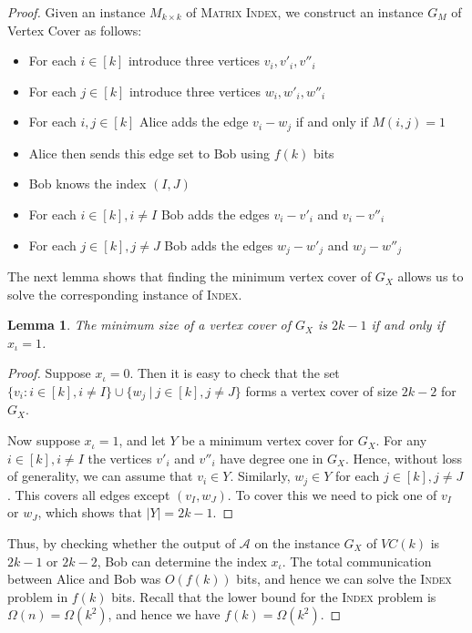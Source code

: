 \documentclass[11pt,letter]{article}
\newtheorem{lemma}[theorem]{Lemma}
\begin{document}
\begin{proof}
{Given an instance $M_{k\times k}$ of \textsc{Matrix Index},
we construct an instance $G_M$ of Vertex Cover as follows:
\begin{itemize}
\item For each $i\in [k]$ introduce three vertices $v_i, v'_i, v''_i$
\item For each $j\in [k]$ introduce three vertices $w_i, w'_i, w''_i$
\item For each $i,j\in [k]$ Alice adds the edge $v_i - w_j$ if and only if $M(i,j)=1$
\item Alice then sends this edge set to Bob using $f(k)$ bits
\item Bob knows the index $(I,J)$
\item For each $i\in [k], i\neq I$ Bob adds the edges $v_i - v'_i$ and $v_i - v''_i$
\item For each $j\in [k], j\neq J$ Bob adds the edges $w_j - w'_j$ and $w_j - w''_j$
\end{itemize}
}

The next lemma shows that finding the minimum vertex cover of $G_X$
allows us to solve the corresponding instance of \textsc{Index}.


\begin{lemma}
The minimum size of a vertex cover of $G_X$ is $2k-1$ if and only if
$x_\iota = 1$.
\label{thm:lower-bound-vc-insertion}
\end{lemma}
\begin{proof}
Suppose $x_\iota = 0$.
Then it is easy to check that the set $\{v_i : i\in [k], i\neq I\}\cup \{w_j\ |\ j\in [k], j\neq J\}$
forms a vertex cover of size $2k-2$ for $G_X$.

Now suppose
$x_\iota = 1$,
and let $Y$ be a minimum vertex cover for $G_X$.
For any $i\in [k], i\neq I$ the vertices $v'_i$ and $v''_i$ have degree one in $G_X$.
Hence, without loss of generality, we can assume that $v_i\in Y$.
Similarly, $w_j\in Y$ for each $j\in [k], j\neq J$.
This covers all edges except $(v_{I},w_{J})$.
To cover this we need to pick one of $v_I$ or $w_J$,
which shows that $|Y|=2k-1$.
\end{proof}
Thus, by checking whether the output of $\mathcal{A}$ on the instance
$G_X$ of $VC(k)$ is $2k-1$ or $2k-2$, Bob can determine the index
$x_\iota$.
The total communication between Alice and Bob was $O(f(k))$ bits,
and hence we can solve the \textsc{Index} problem in $f(k)$ bits. Recall that the
lower bound for the \textsc{Index} problem is $\Omega(n)=\Omega(k^2)$, and hence we have $f(k)=\Omega(k^2)$.
\end{proof}
\end{document}
